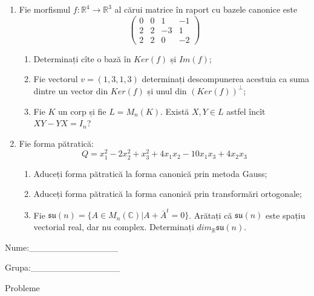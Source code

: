 \documentclass{article}
\begin{document}
\begin{enumerate}
 \item Fie morfismul $f:\mathbb{R}^4 \to \mathbb{R}^3$ al cărui matrice în raport cu bazele canonice este
$$\begin{pmatrix}
0&0&1&-1\\
2&2&-3&1\\
2&2&0&-2
\end{pmatrix}$$

\begin{enumerate}
\item Determinați cîte o bază în $Ker(f)$ și $Im(f)$;
\item Fie vectorul $v=(1,3,1,3)$ determinați descompunerea acestuia ca suma dintre un vector din $Ker(f)$ și unul din $(Ker(f))^\perp$;
\item Fie $K$ un corp și fie $L=M_n(K)$. Există $X,Y \in L$ astfel încît $XY-YX=I_n$?  
\end{enumerate}
\item Fie forma pătratică:
$$Q= x_1^2-2x_2^2+x_3^2+4x_1x_2-10x_1x_3+4x_2x_3$$

\begin{enumerate}
\item Aduceți forma pătratică la forma canonică prin metoda Gauss;
\item Aduceți forma pătratică la forma canonică prin transformări ortogonale;
\item Fie $\mathfrak{su}(n)=\{ A \in M_n(\mathbb{C}) | A+\bar{A}^t=0\}$. Arătați că $\mathfrak{su}(n)$ este spațiu vectorial real, dar nu complex.
Determinați $dim_{\mathbb{R}}\mathfrak{su}(n)$.
\end{enumerate}
\end{enumerate}
\newpage
\begin{flushright}
Nume:\_\_\_\_\_\_\_\_\_\_\_\_\_\_
 
 
Grupa:\_\_\_\_\_\_\_\_\_\_\_\_\_\_
\end{flushright}
\begin{center}
\vspace{2cm}
{\Large Probleme}
\vspace{2cm}
\end{center}
\end{document}
